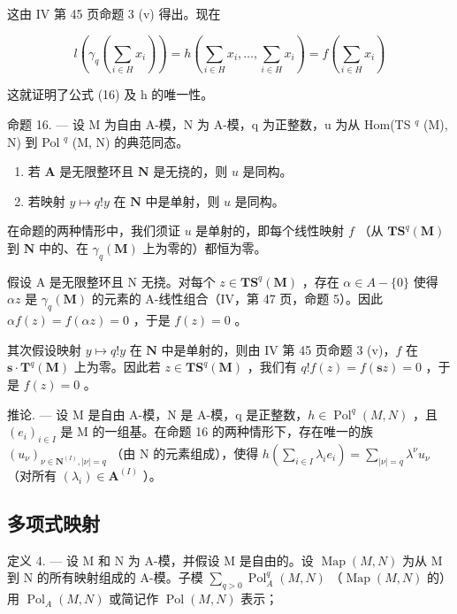 这由 IV 第 45 页命题 3 (v) 得出。现在

\[
l \left(\gamma_ {q} \left(\sum_ {i \in H} x _ {i}\right)\right) = h \left(\sum_ {i \in H} x _ {i}, \dots , \sum_ {i \in H} x _ {i}\right) = f \left(\sum_ {i \in H} x _ {i}\right)
\]

这就证明了公式 (16) 及 h 的唯一性。

命题 16. --- 设 M 为自由 A-模，N 为 A-模，q 为正整数，u 为从 Hom(TS \(^{q}\) (M), N) 到 Pol \(^{q}\) (M, N) 的典范同态。

\begin{enumerate}
\def\labelenumi{(\roman{enumi})}
\item
  若 \(\mathbf{A}\) 是无限整环且 \(\mathbf{N}\) 是无挠的，则 \(u\) 是同构。
\item
  若映射 \(y \mapsto q!y\) 在 \(\mathbf{N}\) 中是单射，则 \(u\) 是同构。
\end{enumerate}

在命题的两种情形中，我们须证 \(u\) 是单射的，即每个线性映射 \(f\) （从 \(\mathbf{TS}^q(\mathbf{M})\) 到 \(\mathbf{N}\) 中的、在 \(\gamma_q(\mathbf{M})\) 上为零的）都恒为零。

假设 A 是无限整环且 N 无挠。对每个 \(z \in \mathbf{TS}^{q}(\mathbf{M})\) ，存在 \(\alpha \in A - \{0\}\) 使得 \(\alpha z\) 是 \(\gamma_{q}(\mathbf{M})\) 的元素的 A-线性组合（IV，第 47 页，命题 5）。因此 \(\alpha f(z) = f(\alpha z) = 0\) ，于是 \(f(z) = 0\) 。

其次假设映射 \(y \mapsto q!y\) 在 \(\mathbf{N}\) 中是单射的，则由 IV 第 45 页命题 3 (v)，\(f\) 在 \(\mathbf{s} \cdot \mathbf{T}^q(\mathbf{M})\) 上为零。因此若 \(z \in \mathbf{T}\mathbf{S}^q(\mathbf{M})\) ，我们有 \(q!f(z) = f(\mathbf{s}z) = 0\) ，于是 \(f(z) = 0\) 。

推论. --- 设 M 是自由 A-模，N 是 A-模，q 是正整数，\(h \in \operatorname{Pol}^{q}(M, N)\) ，且 \((e_{i})_{i \in I}\) 是 M 的一组基。在命题 16 的两种情形下，存在唯一的族 \((u_{\nu})_{\nu \in \mathbf{N}^{(I)}, |\nu| = q}\) （由 N 的元素组成），使得 \(h\left(\sum_{i \in I} \lambda_{i} e_{i}\right) = \sum_{|\nu| = q} \lambda^{\nu} u_{\nu}\) （对所有 \((\lambda_{i}) \in \mathbf{A}^{(I)}\) ）。

\subsection{多项式映射}

定义 4. --- 设 M 和 N 为 A-模，并假设 M 是自由的。设 \(\operatorname{Map}(M, N)\) 为从 M 到 N 的所有映射组成的 A-模。子模 \(\sum_{q > 0} \operatorname{Pol}_{A}^{q}(M, N)\) （\(\operatorname{Map}(M, N)\) 的）用 \(\operatorname{Pol}_{A}(M, N)\) 或简记作 \(\operatorname{Pol}(M, N)\) 表示；

